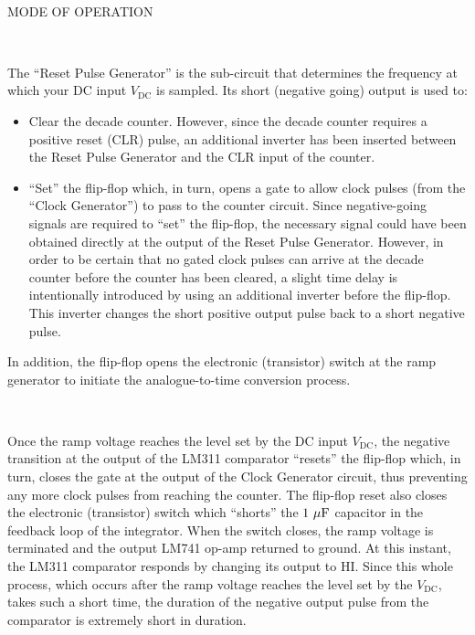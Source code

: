 \documentclass[12pt,oneside,openany,letterpaper]{article}
\begin{document}
~

\noindent MODE OF OPERATION

~

\noindent The ``Reset Pulse Generator'' is the sub-circuit that determines the frequency at which your DC input $V_\mathrm{DC}$ is sampled. Its short (negative going) output is used to:
\begin{itemize}
\item Clear the decade counter. However, since the decade counter requires a positive reset (CLR) pulse, an additional inverter has been inserted between the Reset Pulse Generator and the CLR input of the counter.
\item ``Set'' the flip-flop which, in turn, opens a gate to allow clock pulses (from the ``Clock Generator'') to pass to the counter circuit. Since negative-going signals are required to ``set'' the flip-flop, the necessary signal could have been obtained directly at the output of the Reset Pulse Generator. However, in order to be certain that no gated clock pulses can arrive at the decade counter before the counter has been cleared, a slight time delay is intentionally introduced by using an additional inverter before the flip-flop. This inverter changes the short positive output pulse back to a short negative pulse.
\end{itemize}

\noindent In addition, the flip-flop opens the electronic (transistor) switch at the ramp generator to initiate the analogue-to-time conversion process.

~

\noindent Once the ramp voltage reaches the level set by the DC input $V_\mathrm{DC}$, the negative transition at the output of the LM311 comparator ``resets'' the flip-flop which, in turn, closes the gate at the output of the Clock Generator circuit, thus preventing any more clock pulses from reaching the counter.  The flip-flop reset also closes the electronic (transistor) switch which ``shorts'' the $1\rm\ \mu F$ capacitor in the feedback loop of the integrator.  When the switch closes, the ramp voltage is terminated and the output LM741 op-amp returned to ground. At this instant, the LM311 comparator responds by changing its output to HI. Since this whole process, which occurs after the ramp voltage reaches the level set by the $V_\mathrm{DC}$, takes such a short time, the duration of the negative output pulse from the comparator is extremely short in duration.

~
\end{document}
